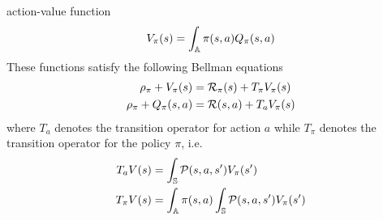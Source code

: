 \documentclass[a4paper,11pt]{article}
\begin{document}
action-value function
\begin{equation}
	V_\pi(s) = \int_{\mathbb{A}} \pi(s,a) Q_\pi(s,a)
\end{equation}
These functions satisfy the following Bellman equations
\begin{equation}
	\begin{split}
		\rho_\pi + V_\pi(s) &= \mathcal{R}_\pi(s) + T_\pi V_\pi(s)\\
		\rho_\pi + Q_\pi(s,a) &= \mathcal{R}(s,a) + T_a V_\pi(s)\\
	\end{split}
\end{equation}
where $T_a$ denotes the transition operator for action $a$ while $T_\pi$
denotes the transition operator for the policy $\pi$, i.e. 
\begin{equation}
	\begin{split}
		T_a V(s) &= \int_{\mathbb{S}} \mathcal{P}(s, a, s') V_\pi(s')\\
		T_\pi V(s) &= \int_{\mathbb{A}} \pi(s,a) \int_{\mathbb{S}} \mathcal{P}(s,a,s') V_\pi(s')\\ 
	\end{split}
\end{equation}
\end{document}
